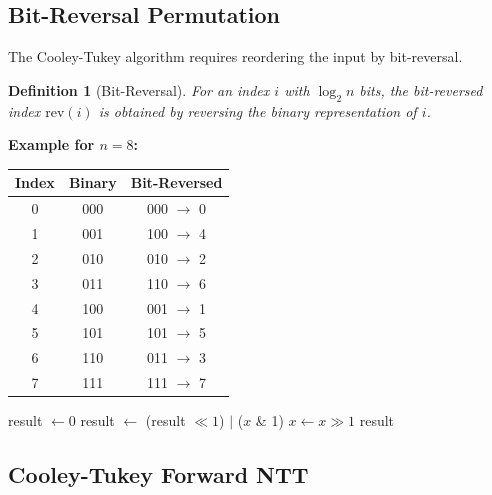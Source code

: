 \documentclass[11pt,a4paper]{article}
\newtheorem{definition}{Definition}
\begin{document}
\subsection{Bit-Reversal Permutation}

The Cooley-Tukey algorithm requires reordering the input by bit-reversal.

\begin{definition}[Bit-Reversal]
For an index $i$ with $\log_2 n$ bits, the bit-reversed index $\text{rev}(i)$ is obtained by reversing the binary representation of $i$.
\end{definition}

\textbf{Example for $n = 8$:}
\begin{center}
\begin{tabular}{c|c|c}
\toprule
Index & Binary & Bit-Reversed \\
\midrule
0 & 000 & 000 $\to$ 0 \\
1 & 001 & 100 $\to$ 4 \\
2 & 010 & 010 $\to$ 2 \\
3 & 011 & 110 $\to$ 6 \\
4 & 100 & 001 $\to$ 1 \\
5 & 101 & 101 $\to$ 5 \\
6 & 110 & 011 $\to$ 3 \\
7 & 111 & 111 $\to$ 7 \\
\bottomrule
\end{tabular}
\end{center}

\begin{algorithm}[H]
\caption{Bit-Reversal}
\begin{algorithmic}[1]
    \State result $\gets 0$
        \State result $\gets$ (result $\ll 1$) $|$ ($x$ \& 1)
        \State $x \gets x \gg 1$
    \EndFor
    \State \Return result
\EndFunction
\end{algorithmic}
\end{algorithm}

\subsection{Cooley-Tukey Forward NTT}
\end{document}
